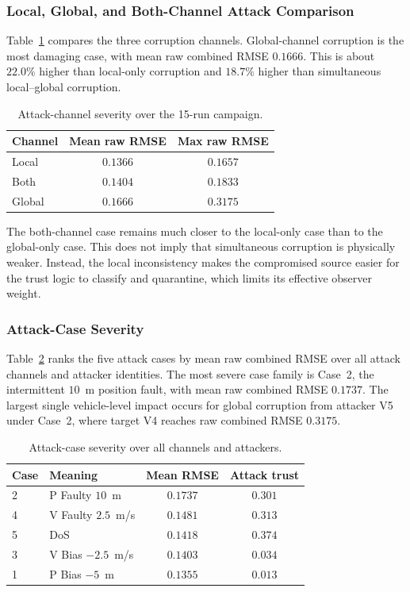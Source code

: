 \documentclass[journal,twoside]{IEEEtran}
\begin{document}
\subsubsection{Local, Global, and Both-Channel Attack Comparison}

Table~\ref{tab:attack_mode_rmse_summary} compares the three corruption channels. Global-channel corruption is the most damaging case, with mean raw combined RMSE $0.1666$. This is about $22.0\%$ higher than local-only corruption and $18.7\%$ higher than simultaneous local--global corruption.

\begin{table}[!t]
\centering
\caption{Attack-channel severity over the 15-run campaign.}
\label{tab:attack_mode_rmse_summary}
\scriptsize
\begin{tabular}{lcc}
\toprule
\textbf{Channel} & \textbf{Mean raw RMSE} & \textbf{Max raw RMSE} \\
\midrule
Local & $0.1366$ & $0.1657$ \\
Both  & $0.1404$ & $0.1833$ \\
Global & $0.1666$ & $0.3175$ \\
\bottomrule
\end{tabular}
\end{table}

The both-channel case remains much closer to the local-only case than to the global-only case. This does not imply that simultaneous corruption is physically weaker. Instead, the local inconsistency makes the compromised source easier for the trust logic to classify and quarantine, which limits its effective observer weight.

\subsubsection{Attack-Case Severity}

Table~\ref{tab:case_ranking} ranks the five attack cases by mean raw combined RMSE over all attack channels and attacker identities. The most severe case family is Case~2, the intermittent $10$~m position fault, with mean raw combined RMSE $0.1737$. The largest single vehicle-level impact occurs for global corruption from attacker V5 under Case~2, where target V4 reaches raw combined RMSE $0.3175$.

\begin{table}[!t]
\centering
\caption{Attack-case severity over all channels and attackers.}
\label{tab:case_ranking}
\scriptsize
\begin{tabular}{p{0.7cm}p{2.55cm}cc}
\toprule
\textbf{Case} & \textbf{Meaning} & \textbf{Mean RMSE} & \textbf{Attack trust} \\
\midrule
2 & P Faulty $10$~m        & $0.1737$ & $0.301$ \\
4 & V Faulty $2.5$~m/s     & $0.1481$ & $0.313$ \\
5 & DoS                    & $0.1418$ & $0.374$ \\
3 & V Bias $-2.5$~m/s      & $0.1403$ & $0.034$ \\
1 & P Bias $-5$~m          & $0.1355$ & $0.013$ \\
\bottomrule
\end{tabular}
\end{table}
\end{document}
